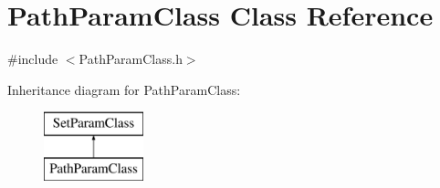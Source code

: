 \hypertarget{class_path_param_class}{}\section{Path\+Param\+Class Class Reference}
\label{class_path_param_class}


{\ttfamily \#include $<$Path\+Param\+Class.\+h$>$}

Inheritance diagram for Path\+Param\+Class\+:\begin{figure}[H]
\begin{center}
\leavevmode
\includegraphics[height=2.000000cm]{class_path_param_class}
\end{center}
\end{figure}
